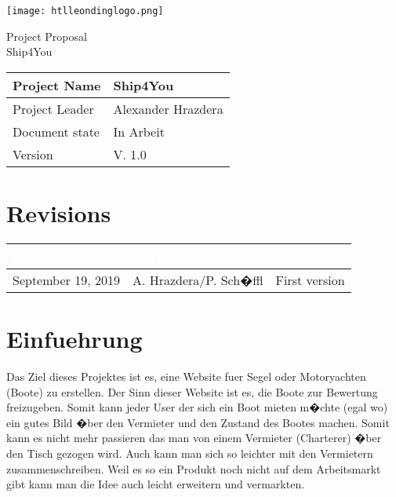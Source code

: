 \documentclass[12pt]{article}
\theoremstyle{definition}
\newenvironment{explanation}{%
   \setlength{\parindent}{0pt}
   \itshape
   \color{blue}
}{}
\newcommand{\projectname}{Ship4You}
\newcommand{\productname}{Ship4You}
\newcommand{\projectleader}{Alexander Hrazdera}
\newcommand{\documentstatus}{In Arbeit}
\newcommand{\version}{V. 1.0}
\begin{document}
\begin{titlepage}
\begin{flushright}
\texttt{[image: htlleondinglogo.png]}\\
\end{flushright}

\vspace{10em}

\begin{center}
{\Huge Project Proposal} \\[3em]
{\LARGE \productname} \\[3em]
\end{center}

\begin{flushleft}
\begin{tabular}{|l|l|}
\hline
Project Name & \projectname \\ \hline
Project Leader & \projectleader \\ \hline
Document state & \documentstatus \\ \hline
Version & \version \\ \hline
\end{tabular}
\end{flushleft}

\end{titlepage}
\section*{Revisions}
\begin{tabular}{|l|l|l|}
\hline
\cellcolor[gray]{0.5}\textcolor{white}{Date} & \cellcolor[gray]{0.5}\textcolor{white}{Author} & \cellcolor[gray]{0.5}\textcolor{white}{Change} \\ \hline
September 19, 2019&A. Hrazdera/P. Sch�ffl&First version \\ \hline
\end{tabular}
\pagebreak

\tableofcontents
\pagebreak

\section{Einfuehrung}
\begin{explanation}
Das Ziel dieses Projektes ist es, eine Website fuer Segel oder Motoryachten (Boote) zu erstellen. Der Sinn dieser Website ist es, die Boote zur Bewertung freizugeben. Somit kann jeder User der sich ein Boot mieten m�chte (egal wo) ein gutes Bild �ber den Vermieter und den Zustand des Bootes machen. Somit kann es nicht mehr passieren das man von einem Vermieter (Charterer) �ber den Tisch gezogen wird. Auch kann man sich so leichter mit den Vermietern zusammenschreiben. Weil es so ein Produkt noch nicht auf dem Arbeitsmarkt gibt kann man die Idee auch leicht erweitern und vermarkten. 

\end{explanation}
\pagebreak
\end{document}
